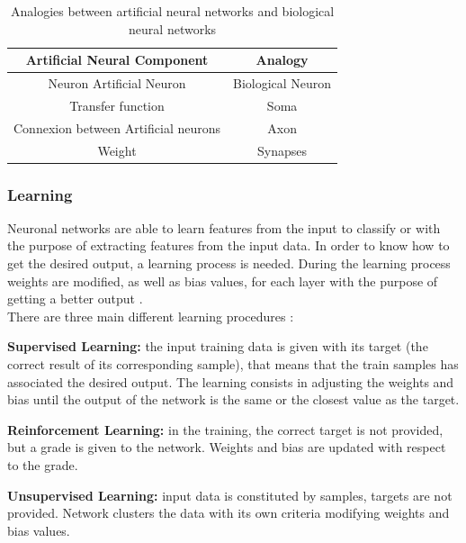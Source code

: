 \begin{table}[htb]
\centering
\begin{tabular}{|c|c|}
\hline
\rowcolor[HTML]{ECF4FF} \textbf{Artificial Neural Component} & \textbf{Analogy}        \\ \hline
Neuron Artificial Neuron                        & Biological Neuron       \\
Transfer function                & Soma \\
Connexion between Artificial neurons               & Axon                     \\
Weight                                     & Synapses                 \\ \hline
\end{tabular}  \caption{Analogies between artificial neural networks and biological neural networks \cite{Analogies}} \label{table:Analogias}
\end{table}

\subsubsection{Learning}
Neuronal networks are able to learn features from the input to classify or with the purpose of extracting features from the input data. In order to know how to get the desired output, a learning process is needed. During the learning process weights are modified, as well as bias values, for each layer with the purpose of getting a better output \cite{NNDesign}.\\

There are three main different learning procedures \cite{NNDesign,Duda}:
\begin{description}[itemsep=2pt,topsep=8pt,parsep=0pt,partopsep=20pt]
	\item \textbf{Supervised Learning:} the input training data is given with its target (the correct result of its corresponding sample), that means that the train samples has associated the desired output. The learning consists in adjusting the weights and bias until the output of the network is the same or the closest value as the target.
	\item \textbf{Reinforcement Learning:} in the training, the correct target is not provided, but a grade is given to the network. Weights and bias are updated with respect to the grade.
	\item \textbf{Unsupervised Learning:} input data is constituted by samples, targets are not provided. Network clusters the data with its own criteria modifying weights and bias values.
\end{description}

